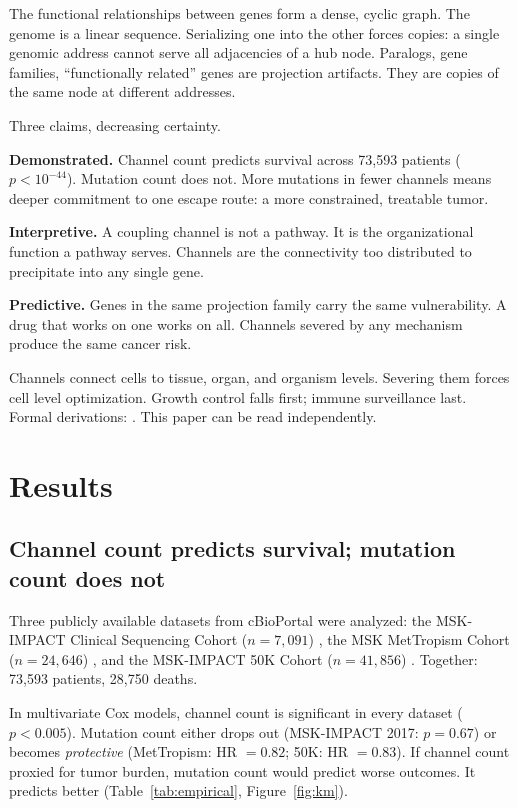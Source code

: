 \documentclass[11pt]{article}
\begin{document}
The functional relationships between genes form a dense, cyclic
graph. The genome is a linear sequence. Serializing one into the
other forces copies: a single genomic address cannot serve all
adjacencies of a hub node. Paralogs, gene families, ``functionally
related'' genes are projection artifacts. They are copies of the
same node at different addresses.

Three claims, decreasing certainty.

\textbf{Demonstrated.} Channel count predicts survival across
73{,}593 patients ($p < 10^{-44}$). Mutation count does not. More
mutations in fewer channels means deeper commitment to one escape
route: a more constrained, treatable tumor.

\textbf{Interpretive.} A coupling channel is not a pathway. It is
the organizational function a pathway serves. Channels are the
connectivity too distributed to precipitate into any single gene.

\textbf{Predictive.} Genes in the same projection family carry the
same vulnerability. A drug that works on one works on all. Channels
severed by any mechanism produce the same cancer risk.

Channels connect cells to tissue, organ, and organism levels.
Severing them forces cell level optimization. Growth control falls
first; immune surveillance last. Formal derivations:
\cite{McCarthy2026_BCA}.
This paper can be read independently.


\section*{Results}

\subsection*{Channel count predicts survival; mutation count does not}

Three publicly available datasets from cBioPortal \cite{Cerami2012}
were analyzed: the MSK-IMPACT Clinical Sequencing Cohort
($n = 7{,}091$) \cite{Zehir2017}, the MSK MetTropism Cohort
($n = 24{,}646$) \cite{Nguyen2022}, and the MSK-IMPACT 50K Cohort
($n = 41{,}856$) \cite{Bandlamudi2024}. Together: 73{,}593 patients,
28{,}750 deaths.

In multivariate Cox models, channel count is significant in every
dataset ($p < 0.005$). Mutation count either drops out (MSK-IMPACT
2017: $p = 0.67$) or becomes \emph{protective} (MetTropism:
HR $= 0.82$; 50K: HR $= 0.83$). If channel count proxied for tumor
burden, mutation count would predict worse outcomes. It predicts
better (Table~\ref{tab:empirical}, Figure~\ref{fig:km}).
\end{document}
